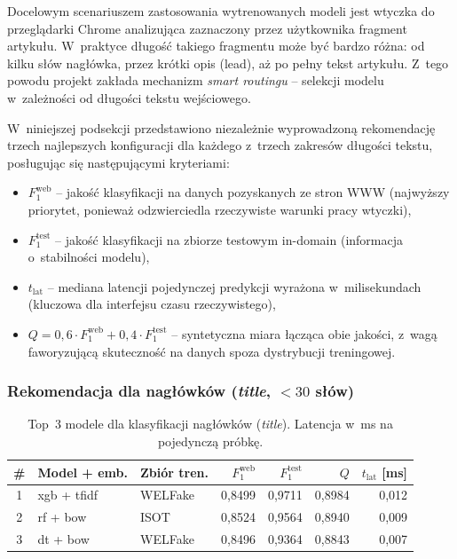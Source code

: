 \documentclass[oneside,polski,logo]{amuthesis}
\begin{document}
Docelowym scenariuszem zastosowania wytrenowanych modeli jest
wtyczka do przeglądarki Chrome analizująca zaznaczony przez
użytkownika fragment artykułu. W~praktyce długość takiego fragmentu
może być bardzo różna: od kilku słów nagłówka, przez krótki opis
(lead), aż po pełny tekst artykułu. Z~tego powodu projekt zakłada
mechanizm \emph{smart routingu} -- selekcji modelu w~zależności od
długości tekstu wejściowego.

W~niniejszej podsekcji przedstawiono niezależnie wyprowadzoną
rekomendację trzech najlepszych konfiguracji dla każdego z~trzech
zakresów długości tekstu, posługując się następującymi kryteriami:

\begin{itemize}
  \item $F_1^{\text{web}}$ -- jakość klasyfikacji na danych
        pozyskanych ze stron WWW (najwyższy priorytet, ponieważ
        odzwierciedla rzeczywiste warunki pracy wtyczki),
  \item $F_1^{\text{test}}$ -- jakość klasyfikacji na zbiorze
        testowym in-domain (informacja o~stabilności modelu),
  \item $t_{\text{lat}}$ -- mediana latencji pojedynczej predykcji
        wyrażona w~milisekundach (kluczowa dla interfejsu czasu
        rzeczywistego),
  \item $Q = 0{,}6 \cdot F_1^{\text{web}} + 0{,}4 \cdot F_1^{\text{test}}$
        -- syntetyczna miara łącząca obie jakości, z~wagą
        faworyzującą skuteczność na danych spoza dystrybucji
        treningowej.
\end{itemize}

\subsubsection*{Rekomendacja dla nagłówków (\textit{title}, $<30$ słów)}

\begin{table}[ht]
\centering
\caption{Top~3 modele dla klasyfikacji nagłówków (\textit{title}).
Latencja w~ms na pojedynczą próbkę.}
\label{tab:rek_title}
\begin{tabular}{cllrrrr}
\toprule
\# & Model + emb. & Zbiór tren. & $F_1^{\text{web}}$ & $F_1^{\text{test}}$ & $Q$ & $t_{\text{lat}}$ [ms] \\
\midrule
1 & xgb + tfidf  & WELFake & 0,8499 & 0,9711 & 0,8984 & 0,012 \\
2 & rf  + bow    & ISOT    & 0,8524 & 0,9564 & 0,8940 & 0,009 \\
3 & dt  + bow    & WELFake & 0,8496 & 0,9364 & 0,8843 & 0,007 \\
\bottomrule
\end{tabular}
\end{table}
\end{document}
